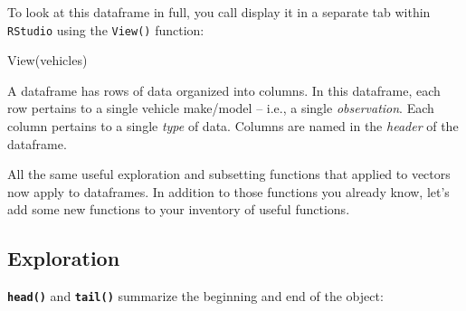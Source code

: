 \documentclass[
]{book}
\newenvironment{Shaded}{\begin{snugshade}}{\end{snugshade}}
\newcommand{\FunctionTok}[1]{\textcolor[rgb]{0.00,0.00,0.00}{#1}}
\newcommand{\NormalTok}[1]{#1}
\begin{document}
To look at this dataframe in full, you call display it in a separate tab within \texttt{RStudio} using the \texttt{View()} function:

\begin{Shaded}
\begin{Highlighting}[]
\FunctionTok{View}\NormalTok{(vehicles)}
\end{Highlighting}
\end{Shaded}

A dataframe has rows of data organized into columns. In this dataframe, each row pertains to a single vehicle make/model -- i.e., a single \emph{observation}. Each column pertains to a single \emph{type} of data. Columns are named in the \emph{header} of the dataframe.

All the same useful exploration and subsetting functions that applied to vectors now apply to dataframes. In addition to those functions you already know, let's add some new functions to your inventory of useful functions.

\hypertarget{exploration}{%
\subsection*{Exploration}\label{exploration}}

\textbf{\texttt{head()}} and \textbf{\texttt{tail()}} summarize the beginning and end of the object:
\end{document}
